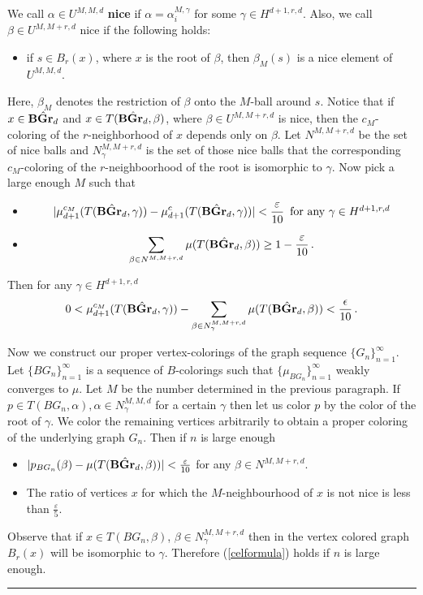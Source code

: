 \documentclass{article}
\newcommand{\ep}{\varepsilon}
\newcommand{\e}{\ep}
\newcommand{\BGrd}[1][d]{\textrm{\textbf{BGr}}_{#1}}
\newcommand{\hb}{\hat{\BGrd}}
\newcommand{\qed} {\hspace {0.1in} \rule {1.5mm} {3.5mm}}
\begin{document}
\noindent
We call $\alpha\in U^{M,M,d}$ {\bf nice} if $\alpha=\alpha^{M,\gamma}_i$ for
some $\gamma\in H^{d+1,r,d}$. Also, we call $\beta\in U^{M,M+r,d}$ nice
if the following holds:
\begin{itemize}
\item if $s\in B_r(x)$, where $x$ is the root of $\beta$, then $\beta_M(s)$ is
  a nice element of $U^{M,M,d}$.
\end{itemize}
Here, $\beta_M$ denotes the restriction of $\beta$ onto the $M$-ball around
$s$. Notice that if $x\in\hb$ and $x\in T(\hb,\beta)$, where $\beta\in
U^{M,M+r,d}$ is nice, then the $c_M$-coloring of the $r$-neighborhood of $x$
depends only on $\beta$. Let $N^{M,M+r,d}$ be the set of nice balls and
$N_\gamma^{M,M+r,d}$ is the set of those nice balls that the corresponding
$c_M$-coloring of the $r$-neighboorhood of the root is isomorphic to $\gamma$.
Now pick a large enough $M$ such that
\begin{itemize}
\item
$$|\mu^{c_M}_{d+1}(T(\hb,\gamma))-
\mu^{c}_{d+1}(T(\hb,\gamma))|<\frac{\e}{10}\,\mbox{ for any 
$\gamma\in H^{d+1,r,d}$}$$
\item
$$\sum_{\beta\in N^{M,M+r,d}} \mu(T(\hb,\beta))\geq 1-\frac{\e}{10}\,.$$
\end{itemize}
Then for any $\gamma\in H^{d+1,r,d}$
$$0 < \mu^{c_M}_{d+1}(T(\hb,\gamma))-\sum_{\beta\in N_\gamma^{M,M+r,d}}
\mu(T(\hb,\beta))<\frac{\epsilon} {10}\,.$$

Now we construct our proper vertex-colorings of the graph sequence
$\{G_n\}^\infty_{n=1}$.
Let $\{BG_n\}^\infty_{n=1}$ is a sequence of $B$-colorings such that
$\{\mu_{BG_n}\}^\infty_{n=1}$ weakly converges to $\mu$.
Let $M$ be the number determined in the previous paragraph. If
$p\in T(BG_n,\alpha),\alpha\in N_\gamma^{M,M,d}$ for a certain $\gamma$
 then let us color $p$ by the
color of the root of $\gamma$. We color the remaining vertices arbitrarily to
obtain a proper coloring of the underlying graph $G_n$.
Then if $n$ is large enough
\begin{itemize}
\item $|p_{BG_n}(\beta)-\mu(T(\hb,\beta))|<\frac{\e}{10}$ for any $\beta\in
  N^{M,M+r,d}$.
\item The ratio of vertices $x$ for which the $M$-neighbourhood of $x$ is not
  nice is less than $\frac{\e}{5}$.
\end{itemize}
Observe that if $x\in T(BG_n,\beta)$, $\beta\in N_\gamma^{M,M+r,d}$ then in
the vertex colored graph $B_r(x)$ will be isomorphic to $\gamma$. Therefore 
(\ref{celformula}) holds if $n$ is large enough. \qed
\end{document}

